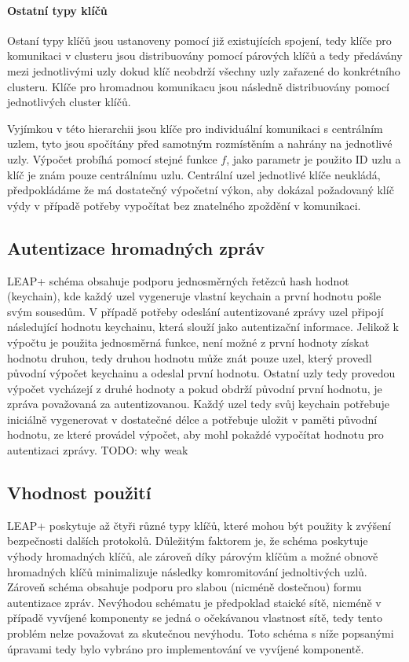 \documentclass[11pt,final,twoside]{fithesis2}
\begin{document}
\paragraph{Ostatní typy klíčů} 
Ostaní typy klíčů jsou ustanoveny pomocí již existujících spojení, tedy klíče pro komunikaci v clusteru jsou distribuovány pomocí párových klíčů a tedy předávány mezi jednotlivými uzly dokud 
klíč neobdrží všechny uzly zařazené do konkrétního clusteru. Klíče pro hromadnou komunikacu jsou následně distribuovány pomocí jednotlivých cluster klíčů. 

Vyjímkou v této hierarchii jsou klíče pro individuální komunikaci s centrálním uzlem, tyto jsou spočítány před samotným rozmístěním a nahrány na jednotlivé uzly. Výpočet probíhá pomocí stejné funkce $f$, 
jako parametr je použito ID uzlu a klíč je znám pouze centrálnímu uzlu. Centrální uzel jednotlivé klíče neukládá, předpokládáme že má dostatečný výpočetní výkon, aby dokázal požadovaný klíč výdy v případě 
potřeby vypočítat bez znatelného zpoždění v komunikaci.

\subsection{Autentizace hromadných zpráv}
LEAP+ schéma obsahuje podporu jednosměrných řetězců hash hodnot \cite{Lamport1981} (keychain), kde každý uzel vygeneruje vlastní keychain a první hodnotu pošle svým sousedům. 
V případě potřeby odeslání autentizované zprávy uzel připojí následující hodnotu keychainu, která slouží jako autentizační informace. Jelikož k výpočtu je použita jednosměrná funkce, není možné z první 
hodnoty získat hodnotu druhou, tedy druhou hodnotu může znát pouze uzel, který provedl původní výpočet keychainu a odeslal první hodnotu. Ostatní uzly tedy provedou výpočet vycházejí z druhé hodnoty a pokud 
obdrží původní první hodnotu, je zpráva považovaná za autentizovanou. Každý uzel tedy svůj keychain potřebuje iniciálně vygenerovat v dostatečné délce a potřebuje uložit v paměti původní hodnotu, ze které 
provádel výpočet, aby mohl pokaždé vypočítat hodnotu pro autentizaci zprávy. TODO: why weak

\subsection{Vhodnost použití}
LEAP+ poskytuje až čtyři různé typy klíčů, které mohou být použity k zvýšení bezpečnosti dalších protokolů. Důležitým faktorem je, že schéma poskytuje výhody hromadných klíčů, ale zároveň díky 
párovým klíčům a možné obnově hromadných klíčů minimalizuje následky komromitování jednoltivých uzlů. Zároveň schéma obsahuje podporu pro slabou (nicméně dostečnou) formu autentizace zpráv. 
Nevýhodou schématu je předpoklad staické sítě, nicméně v případě vyvíjené komponenty se jedná o očekávanou vlastnost sítě, tedy tento problém nelze považovat za skutečnou nevýhodu. Toto 
schéma s níže popsanými úpravami tedy bylo vybráno pro implementování ve vyvíjené komponentě.
\end{document}
